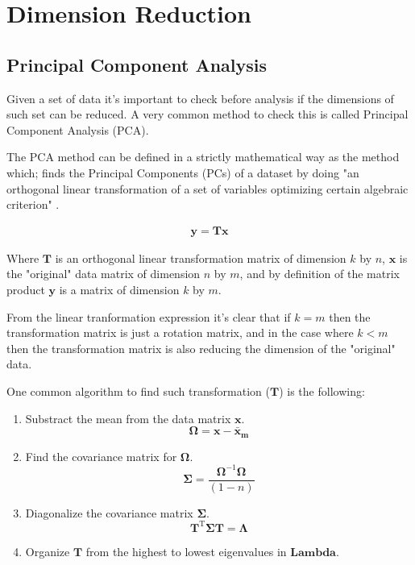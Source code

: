 \chapter{Dimension Reduction}
\label{pca}

\section{Principal Component Analysis}
Given  a set  of data  it's important  to check  before analysis  if the
dimensions of such  set can be reduced. A very  common method to check
this is called Principal Component Analysis (PCA).

The PCA  method can be defined  in a strictly mathematical way as the
method which; finds the Principal  Components (PCs) of  a dataset by
doing  "an orthogonal  linear  transformation of  a  set of  variables
optimizing certain algebraic criterion" \cite{jolliffe2002}.

\begin{gather}
  \mathbf{y} = \mathbf{T} \mathbf{x}
\end{gather}

Where $\mathbf{T}$ is an orthogonal linear transformation matrix of
dimension $k$ by $n$, $\mathbf{x}$ is the "original" data matrix of
dimension $n$ by $m$, and by definition of the matrix product
$\mathbf{y}$ is a matrix of dimension $k$ by $m$.

From the linear tranformation expression it's clear that if $k=m$ then
the transformation matrix is just a rotation matrix, and in the case
where $k<m$ then the transformation matrix is also reducing the
dimension of the "original" data.

One common algorithm to find such transformation ($\mathbf{T}$) is the
following: 

\begin{enumerate}
\item{Substract the mean from the data matrix $\mathbf{x}$.
\begin{equation}
\mathbf{\Omega} = \mathbf{x} - \mathbf{\bar{x}_{m}}
\end{equation}
}
\item{Find the covariance matrix for $\mathbf{\Omega}$.
\begin{equation}
\mathbf{\Sigma} = \frac{\mathbf{\Omega}^{-1} \mathbf{\Omega}}{(1-n)}
\end{equation}  
}  
\item{Diagonalize the covariance matrix $\mathbf{\Sigma}$.
\begin{equation}
\mathbf{T}^{\mathrm{T}} \mathbf{\Sigma} \mathbf{T} = \mathbf{\Lambda}
\end{equation}  
}  
\item{Organize $\mathbf{T}$ from the highest to lowest eigenvalues in
$\mathbf{Lambda}$.}
\end{enumerate}  

